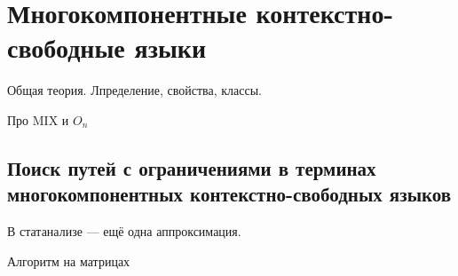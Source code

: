 \chapter{Многокомпонентные контекстно-свободные языки}

Общая теория. Лпределение, свойства, классы.

Про MIX и $O_n$

\section{Поиск путей с ограничениями в терминах многокомпонентных контекстно-свободных языков}

В статанализе --- ещё одна аппроксимация.

Алгоритм на матрицах
